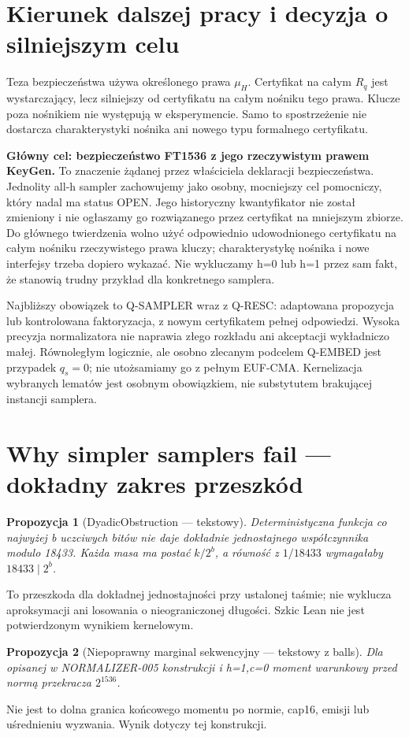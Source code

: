 \documentclass[11pt,a4paper]{article}
\newtheorem{proposition}{Propozycja}
\begin{document}
\section{Kierunek dalszej pracy i decyzja o silniejszym celu}
Teza bezpieczeństwa używa określonego prawa $\mu_H$. Certyfikat na całym
$R_q$ jest wystarczający, lecz silniejszy od certyfikatu na całym nośniku
tego prawa. Klucze poza nośnikiem nie występują w eksperymencie.
Samo to spostrzeżenie nie dostarcza charakterystyki nośnika ani nowego
typu formalnego certyfikatu.

\textbf{Główny cel: bezpieczeństwo FT1536 z jego rzeczywistym prawem KeyGen.}
To znaczenie żądanej przez właściciela deklaracji bezpieczeństwa.
Jednolity all-h sampler zachowujemy jako osobny, mocniejszy cel pomocniczy,
który nadal ma status OPEN. Jego historyczny kwantyfikator nie został
zmieniony i nie ogłaszamy go rozwiązanego przez certyfikat na mniejszym zbiorze.
Do głównego twierdzenia wolno użyć odpowiednio udowodnionego certyfikatu
na całym nośniku rzeczywistego prawa kluczy; charakterystykę nośnika
i nowe interfejsy trzeba dopiero wykazać. Nie wykluczamy h=0 lub h=1
przez sam fakt, że stanowią trudny przykład dla konkretnego samplera.

Najbliższy obowiązek to Q-SAMPLER wraz z Q-RESC: adaptowana propozycja
lub kontrolowana faktoryzacja, z nowym certyfikatem pełnej odpowiedzi.
Wysoka precyzja normalizatora nie naprawia złego rozkładu ani akceptacji
wykładniczo małej. Równoległym logicznie, ale osobno zlecanym podcelem
Q-EMBED jest przypadek $q_s=0$; nie utożsamiamy go z pełnym EUF-CMA.
Kernelizacja wybranych lematów jest osobnym obowiązkiem, nie substytutem
brakującej instancji samplera.

\appendix
\section{Why simpler samplers fail — dokładny zakres przeszkód}
\begin{proposition}[DyadicObstruction — tekstowy]
Deterministyczna funkcja co najwyżej b uczciwych bitów nie daje dokładnie
jednostajnego współczynnika modulo 18433. Każda masa ma postać $k/2^b$,
a równość z $1/18433$ wymagałaby $18433\mid2^b$.
\end{proposition}
To przeszkoda dla dokładnej jednostajności przy ustalonej taśmie;
nie wyklucza aproksymacji ani losowania o nieograniczonej długości.
Szkic Lean nie jest potwierdzonym wynikiem kernelowym.

\begin{proposition}[Niepoprawny marginal sekwencyjny — tekstowy z balls]
Dla opisanej w NORMALIZER-005 konstrukcji i h=1,c=0 moment warunkowy
\emph{przed normą} przekracza $2^{1536}$.
\end{proposition}
Nie jest to dolna granica końcowego momentu po normie, cap16, emisji
lub uśrednieniu wyzwania. Wynik dotyczy tej konstrukcji.
\end{document}
